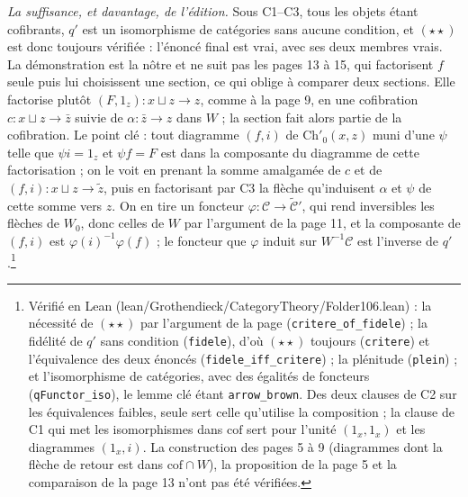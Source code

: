 \documentclass[11pt,a4paper]{article}
\begin{document}
\emph{La suffisance, et davantage, de l'édition.} Sous C1--C3, tous les
objets étant cofibrants, $q'$ est un isomorphisme de catégories sans aucune
condition, et $(\star\star)$ est donc toujours vérifiée : l'énoncé final est
vrai, avec ses deux membres vrais. La démonstration est la nôtre et ne suit
pas les pages 13 à 15, qui factorisent $f$ seule puis lui choisissent une
section, ce qui oblige à comparer deux sections. Elle factorise plutôt
$(F, 1_{z}) : x \sqcup z \to z$, comme à la page 9, en une cofibration
$c : x \sqcup z \to \bar{z}$ suivie de $\alpha : \bar{z} \to z$ dans $W$ ; la
section fait alors partie de la cofibration. Le point clé : tout diagramme
$(f, i)$ de $\mathrm{Ch}'_{0}(x,z)$ muni d'une $\psi$ telle que $\psi i = 1_{z}$
et $\psi f = F$ est dans la composante du diagramme de cette factorisation ;
on le voit en prenant la somme amalgamée de $c$ et de $(f, i) : x \sqcup z \to
\widetilde{z}$, puis en factorisant par C3 la flèche qu'induisent $\alpha$ et
$\psi$ de cette somme vers $z$. On en tire un foncteur $\varphi : \mathcal{C}
\to \widetilde{\mathcal{C}}'$, qui rend inversibles les flèches de $W_{0}$, donc
celles de $W$ par l'argument de la page 11, et la composante de $(f, i)$ est
$\varphi(i)^{-1}\varphi(f)$ ; le foncteur que $\varphi$ induit sur
$W^{-1}\mathcal{C}$ est l'inverse de $q'$.\footnote{Vérifié en Lean
(lean/Grothendieck/CategoryTheory/Folder106.lean) : la nécessité de $(\star\star)$ par
l'argument de la page (\texttt{critere\_of\_fidele}) ; la fidélité de $q'$
sans condition (\texttt{fidele}), d'où $(\star\star)$ toujours
(\texttt{critere}) et l'équivalence des deux énoncés
(\texttt{fidele\_iff\_critere}) ; la plénitude (\texttt{plein}) ; et
l'isomorphisme de catégories, avec des égalités de foncteurs
(\texttt{qFunctor\_iso}), le lemme clé étant \texttt{arrow\_brown}. Des deux
clauses de C2 sur les équivalences faibles, seule sert celle qu'utilise la
composition ; la clause de C1 qui met les isomorphismes dans
$\mathrm{cof}$ sert pour l'unité $(1_{x}, 1_{x})$ et les diagrammes
$(1_{x}, i)$. La construction des pages 5 à 9 (diagrammes dont la flèche
de retour est dans $\mathrm{cof} \cap W$), la proposition de la page 5 et la
comparaison de la page 13 n'ont pas été vérifiées.}
\end{document}
